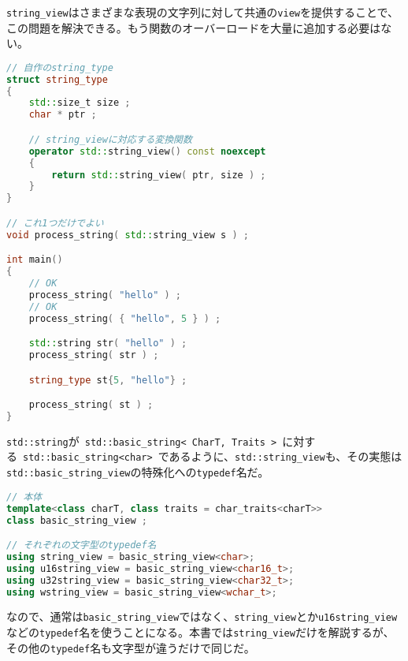 \lstinline!string_view!はさまざまな表現の文字列に対して共通の\lstinline!view!を提供することで、この問題を解決できる。もう関数のオーバーロードを大量に追加する必要はない。

\begin{lstlisting}[language=C++]
// 自作のstring_type
struct string_type
{
    std::size_t size ;
    char * ptr ;

    // string_viewに対応する変換関数
    operator std::string_view() const noexcept
    {
        return std::string_view( ptr, size ) ;
    }
}

// これ1つだけでよい
void process_string( std::string_view s ) ;

int main()
{
    // OK
    process_string( "hello" ) ;
    // OK
    process_string( { "hello", 5 } ) ;

    std::string str( "hello" ) ;
    process_string( str ) ;

    string_type st{5, "hello"} ;

    process_string( st ) ;
}
\end{lstlisting}

%

\lstinline!std::string!が~\lstinline!std::basic_string< CharT, Traits >!~に対する~\lstinline[breaklines=true]!std::basic_string<char>!~であるように、\lstinline!std::string_view!も、その実態は\lstinline[breaklines=true]!std::basic_string_view!の特殊化への\lstinline!typedef!名だ。

\begin{lstlisting}[language=C++]
// 本体
template<class charT, class traits = char_traits<charT>>
class basic_string_view ;

// それぞれの文字型のtypedef名
using string_view = basic_string_view<char>;
using u16string_view = basic_string_view<char16_t>;
using u32string_view = basic_string_view<char32_t>;
using wstring_view = basic_string_view<wchar_t>;
\end{lstlisting}

なので、通常は\lstinline!basic_string_view!ではなく、\lstinline!string_view!とか\lstinline!u16string_view!などの\lstinline!typedef!名を使うことになる。本書では\lstinline!string_view!だけを解説するが、その他の\lstinline!typedef!名も文字型が違うだけで同じだ。

